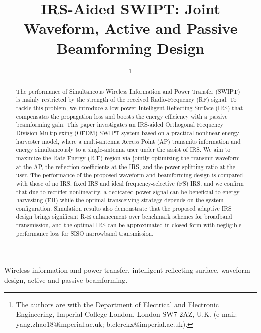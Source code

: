 \documentclass[journal]{IEEEtran}
\begin{document}
	\title{IRS-Aided SWIPT: Joint Waveform, Active and Passive Beamforming Design}
	\author{
		\thanks{
			The authors are with the Department of Electrical and Electronic Engineering, Imperial College London, London SW7 2AZ, U.K. (e-mail: yang.zhao18@imperial.ac.uk; b.clerckx@imperial.ac.uk).
		}
	}
	\maketitle


	\begin{abstract}
		The performance of Simultaneous Wireless Information and Power Transfer (SWIPT) is mainly restricted by the strength of the received Radio-Frequency (RF) signal. To tackle this problem, we introduce a low-power Intelligent Reflecting Surface (IRS) that compensates the propagation loss and boosts the energy efficiency with a passive beamforming gain. This paper investigates an IRS-aided Orthogonal Frequency Division Multiplexing (OFDM) SWIPT system based on a practical nonlinear energy harvester model, where a multi-antenna Access Point (AP) transmits information and energy simultaneously to a single-antenna user under the assist of IRS. We aim to maximize the Rate-Energy (R-E) region via jointly optimizing the transmit waveform at the AP, the reflection coefficients at the IRS, and the power splitting ratio at the user. The performance of the proposed waveform and beamforming design is compared with those of no IRS, fixed IRS and ideal frequency-selective (FS) IRS, and we confirm that due to rectifier nonlinearity, a dedicated power signal can be beneficial to energy harvesting (EH) while the optimal transceiving strategy depends on the system configuration. Simulation results also demonstrate that the proposed adaptive IRS design brings significant R-E enhancement over benchmark schemes for broadband transmission, and the optimal IRS can be approximated in closed form with negligible performance loss for SISO narrowband transmission.
	\end{abstract}


	\begin{IEEEkeywords}
		Wireless information and power transfer, intelligent reflecting surface, waveform design, active and passive beamforming.
	\end{IEEEkeywords}
\end{document}
